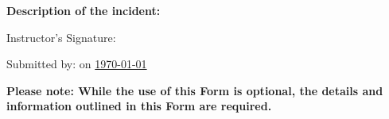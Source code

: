\documentclass[]{article}
\begin{document}
\noindent
\textbf{Description of the incident:} \textit{\detailsOfAllegation}


\vspace{0.8cm}
\noindent
Instructor's Signature:
\vspace{0.8cm}

\noindent
Submitted by: \textbf{\instructor}
on \underline{\today}
\vspace{0.8cm}


\vspace{0.8cm}
\noindent
\textbf{Please note: While the use of this Form is optional, the details and information outlined in this Form are required.}
\end{document}
